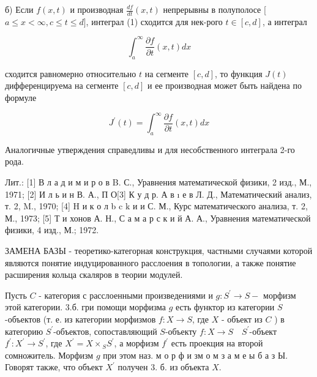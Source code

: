 \documentclass[10pt]{article}
\begin{document}
б) Если $f(x, t)$ и производная $\frac{d f}{d t}(x, t)$ непрерывны в полуполосе [ $a \leqslant x<\infty, c \leqslant t \leqslant d]$, интеграл (1) сходится для нек-рого $t \in[c, d]$, а интеграл



\[

\int_{a}^{\infty} \frac{\partial f}{\partial t}(x, t) d x

\]



сходится равномерно относительно $t$ на сегменте $[c, d]$, то функция $J(t)$ дифференцируема на сегменте $[c, d]$ и ее производная может быть найдена по формуле



\[

J^{\prime}(t)=\int_{a}^{\infty} \frac{\partial f}{\partial t}(x, t) d x

\]



Аналогичные утверждения справедливы и для несобственного интеграла 2-го рода.



Лит.: [1] В л а д и м и р о в B. С., Уравнения математической физики, 2 изд., М., 1971; [2] И л ь и н В. А., П О[3] К у д р. А в ı е в Л. Д., Математический анализ, т. 2, M., 1970; [4] H и к о л b c $\mathrm{k}$ и и С. М., Курс математического анализа, т. 2, М., 1973; [5] Т и хонов А. Н., С а м а р с к и й А. А., Уравнения математической физики, 4 изд., М.; 1972.



ЗАМЕНА БАЗЫ - теоретико-категорная конструкция, частными случаями которой являются понятие индуцированного расслоения в топологии, а также понятие расширения кольца скаляров в теории модулей.



Пусть $C$ - категория с расслоенными произведениями и $g: S^{\prime} \rightarrow S-$ морфизм этой категории. 3.б. гри помощи морфизма $g$ есть функтор из категории $S$-объектов (т. е. из категории морфизмов $f: X \rightarrow S$, где $X$ - объект из $C$ ) в категорию $S^{\prime}$-объектов, сопоставляющий $S$-объекту $f: X \rightarrow S \quad S^{\prime}$-объект $f^{\prime}: X^{\prime} \rightarrow S^{\prime}$, где $X^{\prime}=X \times{ }_{S} S^{\prime}$, а морфизм $f^{\prime}$ есть проекция на второй сомножитель. Морфизм $g$ при этом наз. м о р ф и зм о м з а м е ы б а з Ы. Говорят также, что объект $X^{\prime}$ получен 3. б. из объекта $X$.
\end{document}
